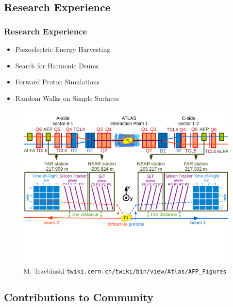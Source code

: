 \documentclass{beamer}
\begin{document}

\subsection{Research Experience}

\begin{frame}
\frametitle{Research Experience}

\begin{itemize}
	\item Piezoelectric Energy Harvesting
	\item Search for Harmonic Drums
	\item Forward Proton Simulations
	\item Random Walks on Simple Surfaces
\end{itemize}

\begin{figure}
	\includegraphics[width=0.7\linewidth]{images/afp_general_scheme.pdf}
	\caption{M. Trzebinski \texttt{twiki.cern.ch/twiki/bin/view/Atlas/AFP\_Figures} }
\end{figure}

\end{frame}


\subsection{Contributions to Community}
\end{document}

